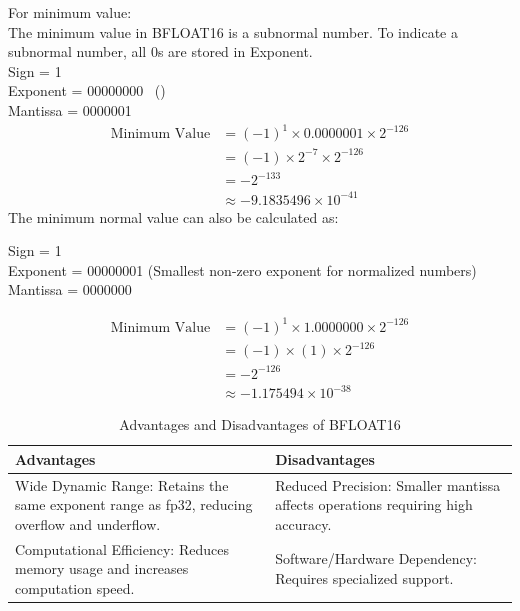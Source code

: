 \begin{enumerate}[label=\textbf{\roman*.}]
    For minimum value:\\
    The minimum value in BFLOAT16 is a subnormal number. To indicate a subnormal number, all 0s are stored in Exponent. \\
    Sign = 1 \\
    Exponent = 00000000 \ () \\
    Mantissa = 0000001
    \[
        \begin{aligned}
            \text{Minimum Value} &= (-1)^{1} \times 0.0000001 \times 2^{-126} \\
            & = (-1) \times 2^{-7} \times 2^{-126} \\
            & = -2^{-133} \\
            & \approx -9.1835496 \times 10^{-41}
        \end{aligned}
    \]
    The minimum normal value can also be calculated as:

        Sign = 1 \\
        Exponent = 00000001 (Smallest non-zero exponent for normalized numbers) \\
        Mantissa = 0000000

    \[
        \begin{aligned}
            \text{Minimum Value} &= (-1)^{1} \times 1.0000000 \times 2^{-126} \\
            & = (-1) \times (1) \times 2^{-126} \\
            & =  -2^{-126} \\
            & \approx -1.175494 \times 10^{-38}
        \end{aligned}
    \]

    \begin{table}[H]
        \centering
        \caption{Advantages and Disadvantages of BFLOAT16}
        \label{tab:bfloat16}
            \begin{tabular}{|p{6cm}|p{6cm}|}
            \hline
            \textbf{Advantages} & \textbf{Disadvantages} \\
            \hline
            Wide Dynamic Range: Retains the same exponent range as fp32, reducing overflow and underflow. & Reduced Precision: Smaller mantissa affects operations requiring high accuracy. \\
            \hline
            Computational Efficiency: Reduces memory usage and increases computation speed. & 
            Software/Hardware Dependency: Requires specialized support.\\
            \hline
            \end{tabular}
    \end{table}


\end{enumerate}
